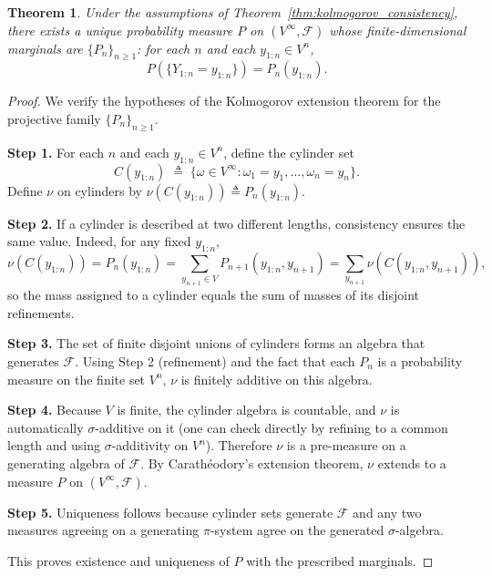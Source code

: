 \documentclass[10pt,a4paper]{amsart}
\newtheorem{theorem}{Theorem}
\begin{document}
\begin{theorem}
Under the assumptions of Theorem~\ref{thm:kolmogorov_consistency}, there exists a unique probability
measure $P$ on $(V^\infty,\mathcal F)$ whose finite-dimensional marginals are $\{P_n\}_{n\ge 1}$:
for each $n$ and each $y_{1:n}\in V^n$,
\[
P(\{Y_{1:n}=y_{1:n}\}) = P_n(y_{1:n}).
\]
\end{theorem}

\begin{proof}
We verify the hypotheses of the Kolmogorov extension theorem for the projective family $\{P_n\}_{n\ge 1}$.

\textbf{Step 1.}
For each $n$ and each $y_{1:n}\in V^n$, define the cylinder set
\[
C(y_{1:n}) \;\triangleq\; \{ \omega\in V^\infty : \omega_1=y_1,\dots,\omega_n=y_n\}.
\]
Define $\nu$ on cylinders by $\nu(C(y_{1:n})) \triangleq P_n(y_{1:n})$.

\textbf{Step 2.}
If a cylinder is described at two different lengths, consistency ensures the same value.
Indeed, for any fixed $y_{1:n}$,
\[
\nu(C(y_{1:n}))
=
P_n(y_{1:n})
=
\sum_{y_{n+1}\in V} P_{n+1}(y_{1:n},y_{n+1})
=
\sum_{y_{n+1}} \nu(C(y_{1:n},y_{n+1})),
\]
so the mass assigned to a cylinder equals the sum of masses of its disjoint refinements.

\textbf{Step 3.}
The set of finite disjoint unions of cylinders forms an algebra that generates $\mathcal F$.
Using Step 2 (refinement) and the fact that each $P_n$ is a probability measure on the finite set $V^n$,
$\nu$ is finitely additive on this algebra.

\textbf{Step 4.}
Because $V$ is finite, the cylinder algebra is countable, and $\nu$ is automatically $\sigma$-additive
on it (one can check directly by refining to a common length and using $\sigma$-additivity on $V^n$).
Therefore $\nu$ is a pre-measure on a generating algebra of $\mathcal F$.
By Carath\'eodory's extension theorem, $\nu$ extends to a measure $P$ on $(V^\infty,\mathcal F)$.

\textbf{Step 5.}
Uniqueness follows because cylinder sets generate $\mathcal F$ and any two measures agreeing on a generating
$\pi$-system agree on the generated $\sigma$-algebra.

This proves existence and uniqueness of $P$ with the prescribed marginals.
\end{proof}
\end{document}
